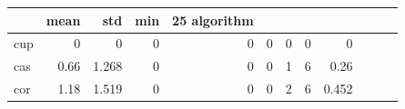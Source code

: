 \begin{tabular}{lrrrrrrrr}
\toprule
 & mean & std & min & 25%
algorithm &  &  &  &  &  &  &  &  \\
\midrule
cup & 0 & 0 & 0 & 0 & 0 & 0 & 0 & 0 \\
cas & 0.66 & 1.268 & 0 & 0 & 0 & 1 & 6 & 0.26 \\
cor & 1.18 & 1.519 & 0 & 0 & 0 & 2 & 6 & 0.452 \\
\bottomrule
\end{tabular}
